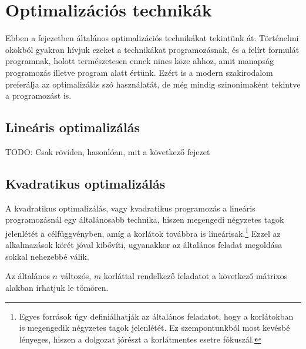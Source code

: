 
\chapter{Optimalizációs technikák}
Ebben a fejezetben általános optimalizációs technikákat tekintünk át. Történelmi okokból gyakran hívjuk ezeket a technikákat programozásnak, és a felírt formulát programnak, holott természetesen ennek nincs köze ahhoz, amit manapság programozás illetve program alatt értünk. Ezért is a modern szakirodalom preferálja az optimalizálás szó használatát, de még mindig szinonimaként tekintve a programozást is.



\section{Lineáris optimalizálás}

TODO: Csak röviden, hasonlóan, mit a következő fejezet



\section{Kvadratikus optimalizálás}\label{sec:QuadOpt}

A kvadratikus optimalizálás, vagy kvadratikus programozás a lineáris programozásnál egy általánosabb technika, hiszen megengedi négyzetes tagok jelenlétét a célfüggvényben, amíg a korlátok továbbra is lineárisak.\footnote{Egyes források úgy definiálhatják az általános feladatot, hogy a korlátokban is megengedik négyzetes tagok jelenlétét. Ez szempontunkból most kevésbé lényeges, hiszen a dolgozat jórészt a korlátmentes esetre fókuszál.} Ezzel az alkalmazások körét jóval kibővíti, ugyanakkor az általános feladat megoldása sokkal nehezebbé válik. 

Az általános $n$ változós, $m$ korláttal rendelkező feladatot a következő mátrixos alakban írhatjuk le tömören.

